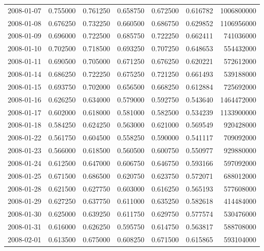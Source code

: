 \begin{tabular}{lrrrrrr}
2008-01-07 &    0.755000 &    0.761250 &    0.658750 &    0.672500 &    0.616782 &  1006800000 \\
2008-01-08 &    0.676250 &    0.732250 &    0.660500 &    0.686750 &    0.629852 &  1106956000 \\
2008-01-09 &    0.696000 &    0.722500 &    0.685750 &    0.722250 &    0.662411 &   741036000 \\
2008-01-10 &    0.702500 &    0.718500 &    0.693250 &    0.707250 &    0.648653 &   554432000 \\
2008-01-11 &    0.690500 &    0.705000 &    0.671250 &    0.676250 &    0.620221 &   572612000 \\
2008-01-14 &    0.686250 &    0.722250 &    0.675250 &    0.721250 &    0.661493 &   539188000 \\
2008-01-15 &    0.693750 &    0.702000 &    0.656500 &    0.668250 &    0.612884 &   725692000 \\
2008-01-16 &    0.626250 &    0.634000 &    0.579000 &    0.592750 &    0.543640 &  1464472000 \\
2008-01-17 &    0.602000 &    0.618000 &    0.581000 &    0.582500 &    0.534239 &  1133900000 \\
2008-01-18 &    0.584250 &    0.624250 &    0.563000 &    0.621000 &    0.569549 &   920428000 \\
2008-01-22 &    0.561750 &    0.604500 &    0.558250 &    0.590000 &    0.541117 &   709092000 \\
2008-01-23 &    0.566000 &    0.618500 &    0.560500 &    0.600750 &    0.550977 &   929880000 \\
2008-01-24 &    0.612500 &    0.647000 &    0.606750 &    0.646750 &    0.593166 &   597092000 \\
2008-01-25 &    0.671500 &    0.686500 &    0.620750 &    0.623750 &    0.572071 &   688012000 \\
2008-01-28 &    0.621500 &    0.627750 &    0.603000 &    0.616250 &    0.565193 &   577608000 \\
2008-01-29 &    0.627250 &    0.637750 &    0.611000 &    0.635250 &    0.582618 &   414484000 \\
2008-01-30 &    0.625000 &    0.639250 &    0.611750 &    0.629750 &    0.577574 &   530476000 \\
2008-01-31 &    0.616000 &    0.626250 &    0.595750 &    0.614750 &    0.563817 &   588708000 \\
2008-02-01 &    0.613500 &    0.675000 &    0.608250 &    0.671500 &    0.615865 &   593104000 \\

\end{tabular}
